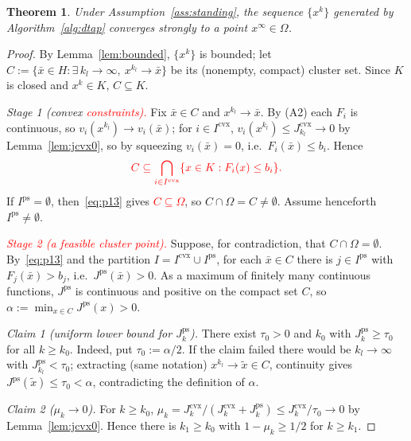 \documentclass[]{interact}
\theoremstyle{plain}
\newtheorem{theorem}{Theorem}[section]
\theoremstyle{definition}
\theoremstyle{remark}
\newcommand{\cvx}{\mathrm{cvx}}
\newcommand{\ps}{\mathrm{ps}}
\begin{document}
\begin{theorem}\label{thm:strong}
Under Assumption~\ref{ass:standing}, the sequence $\{x^k\}$ generated by
Algorithm~\ref{alg:dtap} converges strongly to a point $x^\infty\in\Omega$.
\end{theorem}
\begin{proof}
By Lemma~\ref{lem:bounded}, $\{x^k\}$ is bounded; let
$C:=\{\bar x\in H:\exists\,k_l\to\infty,\ x^{k_l}\to\bar x\}$ be its (nonempty, compact)
cluster set. Since $K$ is closed and $x^k\in K$, $C\subseteq K$.

\emph{Stage 1 (convex \leavevmode\textcolor{red}{constraints).}} Fix $\bar x\in C$ and $x^{k_l}\to\bar x$. By (A2) each
$F_i$ is continuous, so $v_i(x^{k_l})\to v_i(\bar x)$; for $i\in I^{\cvx}$,
$v_i(x^{k_l})\le J^{\cvx}_{k_l}\to0$ by Lemma~\ref{lem:jcvx0}, so by squeezing
$v_i(\bar x)=0$, i.e.\ $F_i(\bar x)\le b_i$. Hence
\begin{equation}\label{eq:p13}\textcolor{red}{
C\subseteq\bigcap_{i\in I^{\cvx}}\{x\in K:F_i(x)\le b_i\}.
}\end{equation}
If $I^{\ps}=\emptyset$, then~\eqref{eq:p13} gives \leavevmode\textcolor{red}{$C\subseteq\Omega$},
so $C\cap\Omega=C\ne\emptyset$.
Assume henceforth $I^{\ps}\ne\emptyset$.

\emph{\leavevmode\textcolor{red}{Stage 2 (a feasible cluster point).}} Suppose, for contradiction, that
$C\cap\Omega=\emptyset$. By~\eqref{eq:p13} and the partition $I=I^{\cvx}\cup I^{\ps}$, for
each $\bar x\in C$ there is $j\in I^{\ps}$ with $F_j(\bar x)>b_j$, i.e.\
$J^{\ps}(\bar x)>0$. As a maximum of finitely many continuous functions, $J^{\ps}$ is
continuous and positive on the compact set $C$, so $\alpha:=\min_{x\in C}J^{\ps}(x)>0$.

\smallskip
\emph{Claim 1 (uniform lower bound for $J^{\ps}_k$).} There exist $\tau_0>0$ and $k_0$
with $J^{\ps}_k\ge\tau_0$ for all $k\ge k_0$. Indeed, put $\tau_0:=\alpha/2$. If the claim
failed there would be $k_l\to\infty$ with $J^{\ps}_{k_l}<\tau_0$; extracting (same
notation) $x^{k_l}\to\tilde x\in C$, continuity gives $J^{\ps}(\tilde x)\le\tau_0<\alpha$,
contradicting the definition of $\alpha$.

\smallskip
\emph{Claim 2 ($\mu_k\to0$).} For $k\ge k_0$,
$\mu_k=J^{\cvx}_k/(J^{\cvx}_k+J^{\ps}_k)\le J^{\cvx}_k/\tau_0\to0$ by
Lemma~\ref{lem:jcvx0}. Hence there is $k_1\ge k_0$ with $1-\mu_k\ge1/2$ for $k\ge k_1$.


\end{proof}
\end{document}
